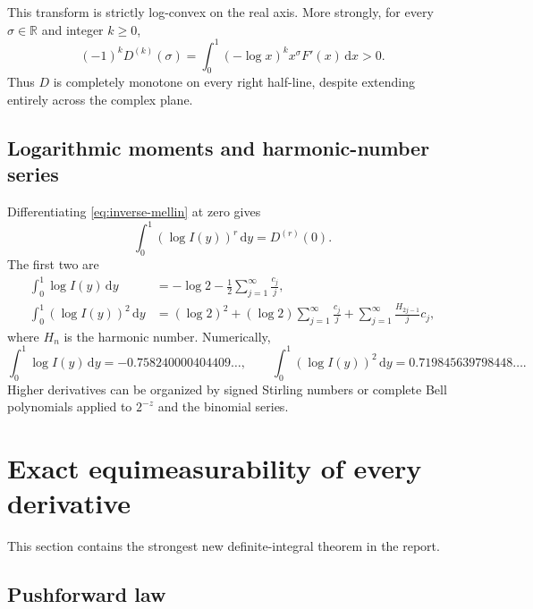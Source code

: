 \documentclass[11pt]{article}
\theoremstyle{definition}
\theoremstyle{remark}
\newcommand{\R}{\mathbb R}
\newcommand{\dd}{\,\mathrm d}
\begin{document}
This transform is strictly log-convex on the real axis.  More strongly, for every
\(\sigma\in\R\) and integer \(k\ge0\),
\begin{equation}
 (-1)^kD^{(k)}(\sigma)
 =\int_0^1(-\log x)^kx^\sigma F'(x)\dd x>0.              \label{eq:D-complete-monotone}
\end{equation}
Thus \(D\) is completely monotone on every right half-line, despite extending entirely
across the complex plane.

\subsection{Logarithmic moments and harmonic-number series}

Differentiating \eqref{eq:inverse-mellin} at zero gives
\begin{equation}
 \int_0^1(\log I(y))^r\dd y=D^{(r)}(0).                   \label{eq:inverse-log-moments}
\end{equation}
The first two are
\begin{align}
 \int_0^1\log I(y)\dd y
 &=-\log2-\frac12\sum_{j=1}^{\infty}\frac{c_j}{j},       \label{eq:logI-first}\\
 \int_0^1(\log I(y))^2\dd y
 &=(\log2)^2+(\log2)\sum_{j=1}^{\infty}\frac{c_j}{j}
   +\sum_{j=1}^{\infty}\frac{H_{2j-1}}{j}c_j,            \label{eq:logI-second}
\end{align}
where \(H_n\) is the harmonic number.  Numerically,
\begin{equation}
 \int_0^1\log I(y)\dd y=-0.758240000404409\ldots,\qquad
 \int_0^1(\log I(y))^2\dd y=0.719845639798448\ldots.    \label{eq:logI-numeric}
\end{equation}
Higher derivatives can be organized by signed Stirling numbers or complete Bell
polynomials applied to \(2^{-z}\) and the binomial series.

\section{Exact equimeasurability of every derivative}

This section contains the strongest new definite-integral theorem in the report.

\subsection{Pushforward law}
\end{document}

